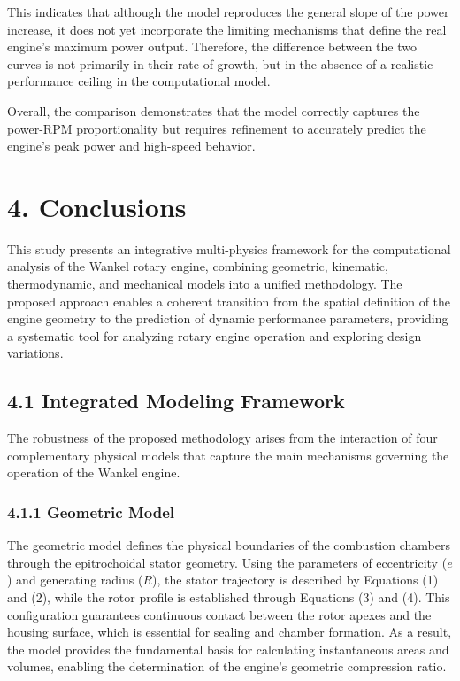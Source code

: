 \documentclass[man,floatsintext,noextraspace]{apa6}
\begin{document}
This indicates that although the model reproduces the general slope of the power increase, it does not yet incorporate the limiting mechanisms that define the real engine’s maximum power output. Therefore, the difference between the two curves is not primarily in their rate of growth, but in the absence of a realistic performance ceiling in the computational model.

Overall, the comparison demonstrates that the model correctly captures the power-RPM proportionality but requires refinement to accurately predict the engine’s peak power and high-speed behavior.

\section{4. Conclusions}

This study presents an integrative multi-physics framework for the computational analysis of the Wankel rotary engine, combining geometric, kinematic, thermodynamic, and mechanical models into a unified methodology. The proposed approach enables a coherent transition from the spatial definition of the engine geometry to the prediction of dynamic performance parameters, providing a systematic tool for analyzing rotary engine operation and exploring design variations.

\subsection{4.1 Integrated Modeling Framework}

The robustness of the proposed methodology arises from the interaction of four complementary physical models that capture the main mechanisms governing the operation of the Wankel engine.

\subsubsection{4.1.1 Geometric Model}

The geometric model defines the physical boundaries of the combustion chambers through the epitrochoidal stator geometry. Using the parameters of eccentricity ($e$) and generating radius ($R$), the stator trajectory is described by Equations (1) and (2), while the rotor profile is established through Equations (3) and (4). This configuration guarantees continuous contact between the rotor apexes and the housing surface, which is essential for sealing and chamber formation. As a result, the model provides the fundamental basis for calculating instantaneous areas and volumes, enabling the determination of the engine’s geometric compression ratio.
\end{document}

